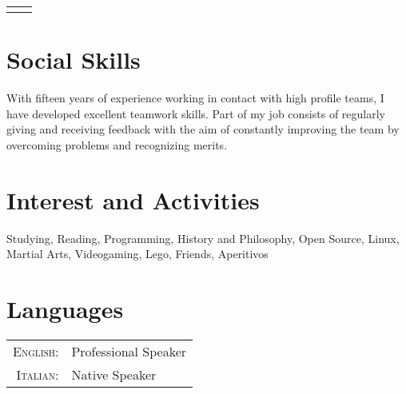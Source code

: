 \documentclass[10pt]{article} %
\begin{document}
\begin{paracol}{2}
\begin{supertabular}{rl}
\end{supertabular}

\begin{supertabular}{rl} %


\end{supertabular}

\section{Social Skills}

With fifteen years of experience working in contact with high profile teams, I have developed
excellent teamwork skills.
Part of my job consists of regularly giving and receiving feedback with the aim of constantly
improving the team by overcoming problems and recognizing merits.


\section{Interest and Activities}

\large Studying, Reading, Programming, History and Philosophy, Open Source, Linux, Martial Arts,
Videogaming, Lego, Friends, Aperitivos

\medskip %


\section{Languages}

\begin{tabular}{rl}
	\textsc{English:} & Professional Speaker\\

	\textsc{Italian:} & Native Speaker\\

\end{tabular}

\medskip %


\end{paracol}

\end{document}
